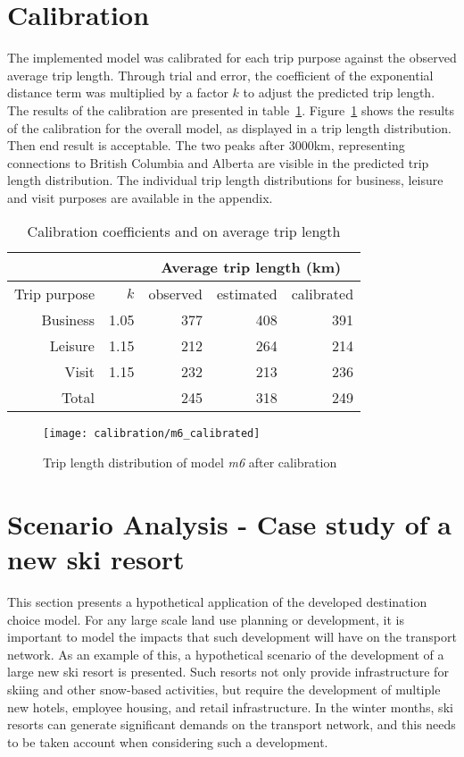 \section{Calibration}

The implemented model was calibrated for each trip purpose against the observed average trip length. Through trial and error, the coefficient of the exponential distance term was multiplied by a factor $k$ to adjust the predicted trip length. The results of the calibration are presented in table~\ref{table:calibration}. Figure~\ref{fig:overall-calibration} shows the results of the calibration for the overall model, as displayed in a trip length distribution. Then end result is acceptable. The two peaks after 3000km, representing connections to British Columbia and Alberta are visible in the predicted trip length distribution. The individual trip length distributions for business, leisure and visit purposes are available in the appendix. 

\begin{table}[H]
\centering
\caption{Calibration coefficients and on average trip length}
\label{table:calibration}
\begin{tabular}{@{}rrrrr@{}}
  \toprule
 &  & \multicolumn{3}{c}{Average trip length (km)} \\ \midrule
 Trip purpose & $k$ & observed & estimated & calibrated \\ \midrule
  Business & 1.05 & 377 & 408 & 391 \\ 
  Leisure & 1.15 & 212 & 264 & 214  \\
  Visit  & 1.15  & 232 & 213 & 236  \\   \midrule
  Total  &  & 245 & 318 & 249  \\ 
   \bottomrule
\end{tabular}
\end{table}

\begin{figure}[H]
\centering
\texttt{[image: calibration/m6\_calibrated]}
\caption{Trip length distribution of model \textit{m6} after calibration}
\label{fig:overall-calibration}
\end{figure}


\section{Scenario Analysis - Case study of a new ski resort}
\label{scenario-analysis}

This section presents a hypothetical application of the developed destination choice model. For any large scale land use planning or development, it is important to model the impacts that such development will have on the transport network. As an example of this, a hypothetical scenario of the development of a large new ski resort is presented. Such resorts not only provide infrastructure for skiing and other snow-based activities, but require the development of multiple new hotels, employee housing, and retail infrastructure. In the winter months, ski resorts can generate significant demands on the transport network, and this needs to be taken account when considering such a development.

